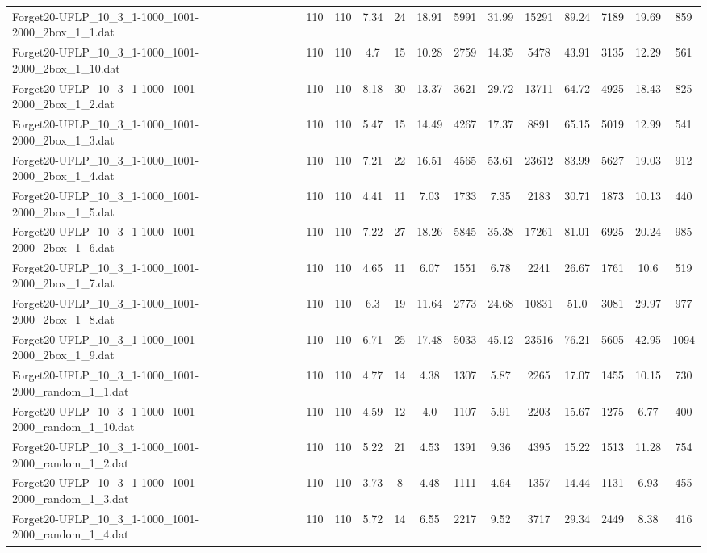 \begin{table}[!ht]
{\begin{tabular}{lcccccccccccc}
Forget20-UFLP\_10\_3\_1-1000\_1001-2000\_2box\_1\_1.dat & 110 & 110 & 7.34 & 24 & 18.91 & 5991 & 31.99 & 15291 & 89.24 & 7189 & 19.69 & 859 \\
Forget20-UFLP\_10\_3\_1-1000\_1001-2000\_2box\_1\_10.dat & 110 & 110 & 4.7 & 15 & 10.28 & 2759 & 14.35 & 5478 & 43.91 & 3135 & 12.29 & 561 \\
Forget20-UFLP\_10\_3\_1-1000\_1001-2000\_2box\_1\_2.dat & 110 & 110 & 8.18 & 30 & 13.37 & 3621 & 29.72 & 13711 & 64.72 & 4925 & 18.43 & 825 \\
Forget20-UFLP\_10\_3\_1-1000\_1001-2000\_2box\_1\_3.dat & 110 & 110 & 5.47 & 15 & 14.49 & 4267 & 17.37 & 8891 & 65.15 & 5019 & 12.99 & 541 \\
Forget20-UFLP\_10\_3\_1-1000\_1001-2000\_2box\_1\_4.dat & 110 & 110 & 7.21 & 22 & 16.51 & 4565 & 53.61 & 23612 & 83.99 & 5627 & 19.03 & 912 \\
Forget20-UFLP\_10\_3\_1-1000\_1001-2000\_2box\_1\_5.dat & 110 & 110 & 4.41 & 11 & 7.03 & 1733 & 7.35 & 2183 & 30.71 & 1873 & 10.13 & 440 \\
Forget20-UFLP\_10\_3\_1-1000\_1001-2000\_2box\_1\_6.dat & 110 & 110 & 7.22 & 27 & 18.26 & 5845 & 35.38 & 17261 & 81.01 & 6925 & 20.24 & 985 \\
Forget20-UFLP\_10\_3\_1-1000\_1001-2000\_2box\_1\_7.dat & 110 & 110 & 4.65 & 11 & 6.07 & 1551 & 6.78 & 2241 & 26.67 & 1761 & 10.6 & 519 \\
Forget20-UFLP\_10\_3\_1-1000\_1001-2000\_2box\_1\_8.dat & 110 & 110 & 6.3 & 19 & 11.64 & 2773 & 24.68 & 10831 & 51.0 & 3081 & 29.97 & 977 \\
Forget20-UFLP\_10\_3\_1-1000\_1001-2000\_2box\_1\_9.dat & 110 & 110 & 6.71 & 25 & 17.48 & 5033 & 45.12 & 23516 & 76.21 & 5605 & 42.95 & 1094 \\
Forget20-UFLP\_10\_3\_1-1000\_1001-2000\_random\_1\_1.dat & 110 & 110 & 4.77 & 14 & 4.38 & 1307 & 5.87 & 2265 & 17.07 & 1455 & 10.15 & 730 \\
Forget20-UFLP\_10\_3\_1-1000\_1001-2000\_random\_1\_10.dat & 110 & 110 & 4.59 & 12 & 4.0 & 1107 & 5.91 & 2203 & 15.67 & 1275 & 6.77 & 400 \\
Forget20-UFLP\_10\_3\_1-1000\_1001-2000\_random\_1\_2.dat & 110 & 110 & 5.22 & 21 & 4.53 & 1391 & 9.36 & 4395 & 15.22 & 1513 & 11.28 & 754 \\
Forget20-UFLP\_10\_3\_1-1000\_1001-2000\_random\_1\_3.dat & 110 & 110 & 3.73 & 8 & 4.48 & 1111 & 4.64 & 1357 & 14.44 & 1131 & 6.93 & 455 \\
Forget20-UFLP\_10\_3\_1-1000\_1001-2000\_random\_1\_4.dat & 110 & 110 & 5.72 & 14 & 6.55 & 2217 & 9.52 & 3717 & 29.34 & 2449 & 8.38 & 416 \\

\end{tabular}}
\end{table}
